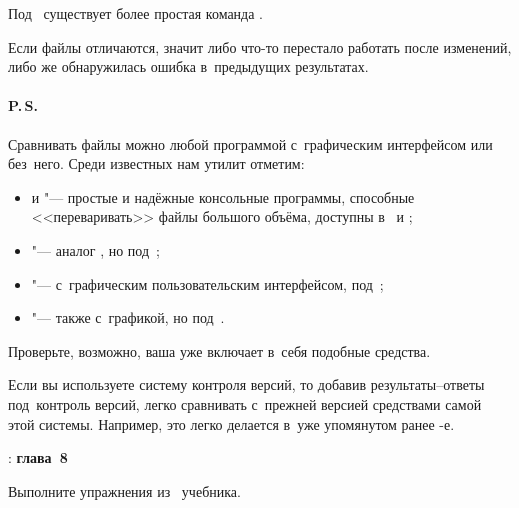 \noindent Под~ существует более простая команда .


Если файлы отличаются, значит либо что-то перестало работать после изменений, либо же обнаружилась ошибка в~предыдущих результатах.



\paragraph{P.\,S.}
Сравнивать файлы можно любой программой с~графическим интерфейсом или без~него. Среди известных нам утилит отметим:

\begin{itemize}
\item {} и  "--- простые и надёжные консольные программы, способные <<переваривать>> файлы большого объёма, доступны в~ и ;
\item {} "--- аналог , но под~;
\item {} "--- с~графическим пользовательским интерфейсом, под~;
\item {} "--- также с~графикой, но под~.
\end{itemize}

\noindent Проверьте, возможно, ваша  уже включает в~себя подобные средства.

Если вы используете систему контроля версий, то добавив результаты--ответы под~контроль версий, легко сравнивать с~прежней версией средствами самой этой системы. Например, это легко делается в~уже упомянутом ранее -е.



\WhatToReadSection
\textcite{Stroustrup:2016:ru}: \textbf{глава~8}



\ExercisesSection
\begin{exercise}
\item Выполните упражнения из~ учебника.

\end{exercise}
